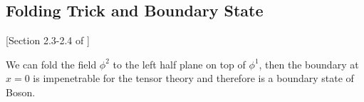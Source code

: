 \documentclass{article}
\begin{document}



\subsection{Folding Trick and Boundary State}


[Section 2.3-2.4 of \cite{bachas_permeable_2002}]

We can fold the field $\phi^2$ to the left half plane on top of $\phi^1$, then the boundary at $x = 0$ is impenetrable for the tensor theory and therefore is a boundary state of Boson. 
\end{document}

